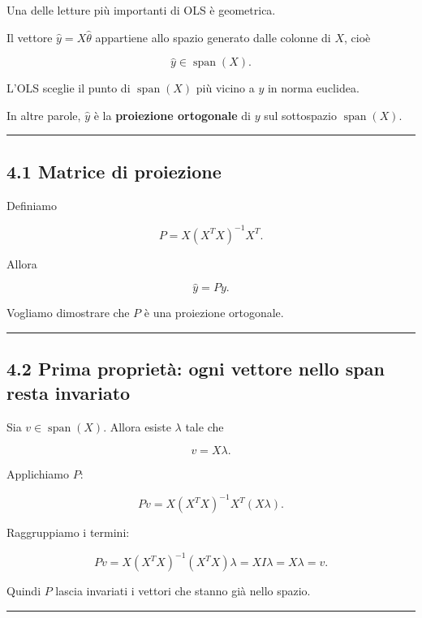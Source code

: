 \documentclass[
]{article}
\begin{document}
Una delle letture più importanti di OLS è geometrica.

Il vettore \(\hat y = X\hat\theta\) appartiene allo spazio generato
dalle colonne di \(X\), cioè

\[
\hat y \in \operatorname{span}(X).
\]

L'OLS sceglie il punto di \(\operatorname{span}(X)\) più vicino a \(y\)
in norma euclidea.

In altre parole, \(\hat y\) è la \textbf{proiezione ortogonale} di \(y\)
sul sottospazio \(\operatorname{span}(X)\).

\begin{center}\rule{0.5\linewidth}{0.5pt}\end{center}

\subsection{4.1 Matrice di proiezione}\label{matrice-di-proiezione}

Definiamo

\[
P = X(X^TX)^{-1}X^T.
\]

Allora

\[
\hat y = Py.
\]

Vogliamo dimostrare che \(P\) è una proiezione ortogonale.

\begin{center}\rule{0.5\linewidth}{0.5pt}\end{center}

\subsection{4.2 Prima proprietà: ogni vettore nello span resta
invariato}\label{prima-proprietuxe0-ogni-vettore-nello-span-resta-invariato}

Sia \(v\in\operatorname{span}(X)\). Allora esiste \(\lambda\) tale che

\[
v=X\lambda.
\]

Applichiamo \(P\):

\[
Pv = X(X^TX)^{-1}X^T(X\lambda).
\]

Raggruppiamo i termini:

\[
Pv = X(X^TX)^{-1}(X^TX)\lambda = XI\lambda = X\lambda = v.
\]

Quindi \(P\) lascia invariati i vettori che stanno già nello spazio.

\begin{center}\rule{0.5\linewidth}{0.5pt}\end{center}
\end{document}
